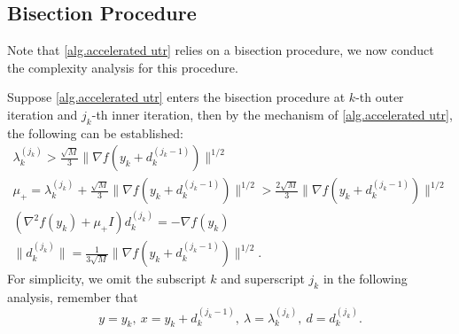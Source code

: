 \documentclass{article}
\begin{document}
\subsection{Bisection Procedure}
Note that \autoref{alg.accelerated utr} relies on a bisection procedure, we now conduct the complexity analysis for this procedure.


Suppose \autoref{alg.accelerated utr} enters the bisection procedure at $k$-th outer iteration and $j_k$-th inner iteration, then by the mechanism of \autoref{alg.accelerated utr}, the following can be established:
    \begin{gather}
    \label{eq.magnitude lambda}
        \lambda_k^{(j_k)} > \frac{\sqrt{M}}{3}\|\nabla f(y_k+d_k^{(j_k-1)})\|^{1/2}\\
    \label{eq.set mu plus}
        \mu_+ = \lambda_k^{(j_k)}+\frac{\sqrt{M}}{3}\|\nabla f(y_k+d_k^{(j_k-1)})\|^{1/2}> \frac{2\sqrt{M}}{3}\|\nabla f(y_k+d_k^{(j_k-1)})\|^{1/2}\\
    \label{eq.newton equation}
        \left (\nabla ^2 f(y_k)+\mu_+ I\right) d_k^{(j_k)}=-\nabla f(y_k)\\
    \label{eq.step size}
        \|d_k^{(j_k)}\| = \frac{1}{3\sqrt{M}}\|\nabla f(y_k+d_k^{(j_k-1)})\|^{1/2}.
    \end{gather}
For simplicity, we omit the subscript $k$ and superscript $j_k$ in the following analysis, remember that 
\begin{equation*}
    y= y_k, \ x = y_k+d_k^{(j_k-1)}, \ \lambda = \lambda_k^{(j_k)}, \ d=d_k^{(j_k)}.
\end{equation*}
\end{document}
